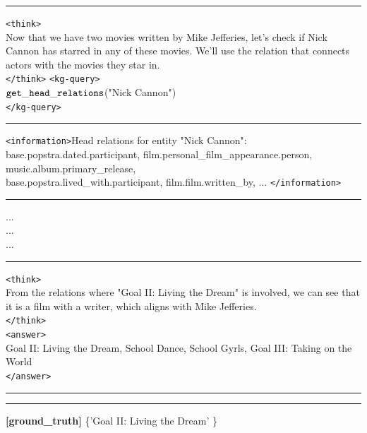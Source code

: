 \begin{table}[H]
\begin{reasonbox}[title=\framework{} Response Example - \dataset{CWQ}]
\vspace{0.5em}\hrule\vspace{0.5em}
\begin{blueblock}
\texttt{<think>} \\
Now that we have two movies written by Mike Jefferies, let's check if Nick Cannon has starred in any of these movies. We'll use the relation that connects actors with the movies they star in. \\
\texttt{</think>}
\texttt{<kg-query>} \\
$\mathtt{get\_head\_relations}$("Nick Cannon") \\
\texttt{</kg-query>} 
\end{blueblock}
\vspace{0.5em}\hrule\vspace{0.5em}
\texttt{<information>}Head relations for entity "Nick Cannon": 
base.popstra.dated.participant, film.personal\_film\_appearance.person, music.album.primary\_release, \\base.popstra.lived\_with.participant, film.film.written\_by, ... \texttt{</information>}
\vspace{0.5em}\hrule\vspace{0.5em}
...
\\
...
\\
...
\vspace{0.5em}\hrule\vspace{0.5em}
\begin{blueblock}
\texttt{<think>} \\
From the relations where "Goal II: Living the Dream" is involved, we can see that it is a film with a writer, which aligns with Mike Jefferies. \\
\texttt{</think>} \\
\texttt{<answer>} \\
Goal II: Living the Dream, School Dance, School Gyrls, Goal III: Taking on the World \\
\texttt{</answer>}
\end{blueblock}
\vspace{0.5em}\hrule\vspace{0.5em}
\vspace{0.1em}\hrule\vspace{0.5em}

\textbf{[ground\_truth]} \{'Goal II: Living the Dream' \}
\end{reasonbox}
\end{table}

